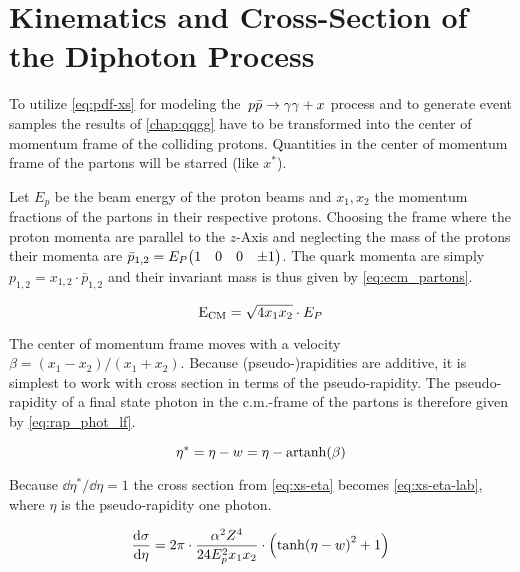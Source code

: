 \section{Kinematics and Cross-Section of the Diphoton Process}%
\label{sec:lab_xs}

To utilize \cref{eq:pdf-xs} for modeling the~\(p\bar{p}\rightarrow\gamma\gamma + x\) process and to
generate event samples the results of \cref{chap:qqgg} have to be
transformed into the center of momentum frame of the colliding
protons. Quantities in the center of momentum frame of the partons
will be starred (like \(x^\ast\)).

Let \(E_p\) be the beam energy of the proton beams and \(x_1, x_2\)
the momentum fractions of the partons in their respective protons.
Choosing the frame where the proton momenta are parallel to the
\(z\)-Axis and neglecting the mass of the protons their momenta are
\(\bar{p}_{1,2} = E_P \mqty(1 & 0 & 0 & \pm1)\). The quark momenta are
simply \(p_{1,2}=x_{1,2}\cdot\bar{p}_{1,2}\) and their invariant mass
is thus given by \cref{eq:ecm_partons}.

\begin{equation}
  \label{eq:ecm_partons}
  \operatorname{E_{\text{CM}}} = \sqrt{4x_1x_2}\cdot E_P
\end{equation}

The center of momentum frame moves with a velocity
\(\beta = (x_1-x_2)/(x_1+x_2)\). Because (pseudo-)rapidities are
additive, it is simplest to work with cross section in terms of the
pseudo-rapidity.  The pseudo-rapidity of a final state photon in the
c.m.-frame of the partons is therefore given
by \cref{eq:rap_phot_lf}.

\begin{equation}
  \label{eq:rap_phot_lf}
  \eta^\ast = \eta - w = \eta - \operatorname{artanh}(\beta)
\end{equation}

Because \(\dd{\eta^\ast}/{\dd{\eta}} = 1\) the cross section
from \cref{eq:xs-eta} becomes \cref{eq:xs-eta-lab}, where \(\eta\) is
the pseudo-rapidity one photon.

\begin{equation}
  \label{eq:xs-eta-lab}
  \dv{\sigma}{\eta} = 2\pi\cdot\frac{\alpha^2Z^4}{24 E_p^2
    x_1x_2}\cdot\qty(\tanh(\eta - w)^2 + 1)
\end{equation}

